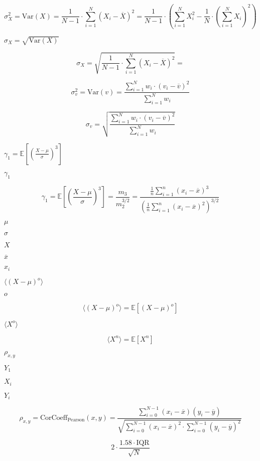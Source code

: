 \documentclass{article}
\begin{document}
\[ \sigma_X^2=\text{Var}(X)=\frac{1}{N-1}\cdot\sum\limits_{i=1}^{N}(X_i-\overline{X})^2=\frac{1}{N-1}\cdot\left(\sum_{i=1}^NX_i^2-\frac{1}{N}\cdot\left(\sum_{i=1}^NX_i\right)^2\right) \]
\pagebreak

$ \sigma_X=\sqrt{\mbox{Var}(X)} $
\pagebreak

\[ \sigma_X=\sqrt{\frac{1}{N-1}\cdot\sum\limits_{i=1}^{N}(X_i-\overline{X})^2}= \]
\pagebreak

\[ \sigma_v^2=\text{Var}(v)=\frac{\sum\limits_{i=1}^{N}w_i\cdot (v_i-\overline{v})^2}{\sum\limits_{i=1}^{N}w_i} \]
\pagebreak

\[ \sigma_v=\sqrt{\frac{\sum\limits_{i=1}^{N}w_i\cdot (v_i-\overline{v})^2}{\sum\limits_{i=1}^{N}w_i}} \]
\pagebreak

$ \gamma_1=\mathbb{E}\left[\left(\frac{X-\mu}{\sigma}\right)^3\right] $
\pagebreak

$ \gamma_1 $
\pagebreak

\[ \gamma_1=\mathbb{E}\left[\left(\frac{X-\mu}{\sigma}\right)^3\right]= \frac{m_3}{m_2^{3/2}} = \frac{\frac{1}{n} \sum_{i=1}^n (x_i-\overline{x})^3}{\left(\frac{1}{n} \sum_{i=1}^n (x_i-\overline{x})^2\right)^{3/2}} \]
\pagebreak

$\mu$
\pagebreak

$\sigma$
\pagebreak

$X$
\pagebreak

$\overline{x}$
\pagebreak

$ x_i$
\pagebreak

$ \langle (X-\mu)^o\rangle $
\pagebreak

$ o $
\pagebreak

\[ \langle (X-\mu)^o\rangle= \mathbb{E}\left[\left(X-\mu\right)^o\right] \]
\pagebreak

$ \langle X^o\rangle $
\pagebreak

\[ \langle X^n\rangle= \mathbb{E}\left[X^n\right] \]
\pagebreak

$ \rho_{x,y} $
\pagebreak

$ Y_1 $
\pagebreak

$ X_i $
\pagebreak

$ Y_i $
\pagebreak

\[ \rho_{x,y}=\text{CorCoeff}_{\text{Pearson}}(x,y)=\frac{\sum\limits_{i=0}^{N-1}(x_i-\overline{x})(y_i-\overline{y})}{\sqrt{\sum\limits_{i=0}^{N-1}(x_i-\overline{x})^2\cdot\sum\limits_{i=0}^{N-1}(y_i-\overline{y})^2}} \]
\pagebreak

\[ 2\cdot\frac{1.58\cdot \mbox{IQR}}{\sqrt{N}} \]
\pagebreak
\end{document}
